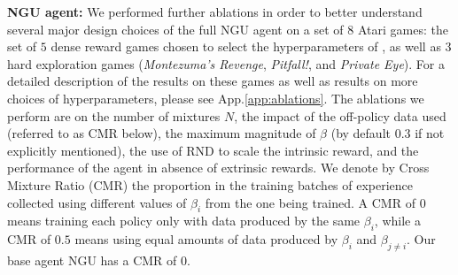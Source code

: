 \documentclass{article} %
\begin{document}
{\bf NGU agent:} We performed further ablations in order to better understand several major design choices of the full NGU agent on a set of $8$ Atari games: the set of $5$ dense reward games chosen to select the hyperparameters of \citet{mnih2015human}, as well as $3$ hard exploration games (\textit{Montezuma's Revenge}, \textit{Pitfall!}, and \textit{Private Eye}). For a detailed description of the results on these games as well as results on more choices of hyperparameters, please see App.\ref{app:ablations}.
%
The ablations we perform are on the number of mixtures $N$, the impact of the off-policy data used (referred to as CMR below), the maximum magnitude of $\beta$ (by default $0.3$ if not explicitly mentioned), the use of RND to scale the intrinsic reward, and the performance of the agent in absence of extrinsic rewards. 
%
We denote by Cross Mixture Ratio (CMR) the proportion in the training batches of experience collected using different values of $\beta_i$ from the one being trained. A CMR of $0$ means training each policy only with data produced by the same $\beta_i$, while a CMR of $0.5$ means using equal amounts of data produced by $\beta_i$ and $\beta_{j\neq i}$. Our base agent NGU has a CMR of $0$.
%
\end{document}
